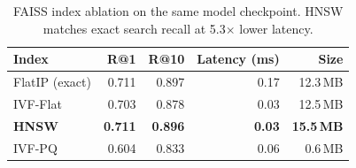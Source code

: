 \begin{table}
\caption{FAISS index ablation on the same model checkpoint. HNSW matches exact search recall at 5.3$\times$ lower latency.}
\label{tab:faiss}
\begin{tabular}{lrrrr}
\toprule
Index & R@1 & R@10 & Latency (ms) & Size \\
\midrule
FlatIP (exact) & 0.711 & 0.897 & 0.17 & 12.3\,MB \\
IVF-Flat & 0.703 & 0.878 & 0.03 & 12.5\,MB \\
\textbf{HNSW} & \textbf{0.711} & \textbf{0.896} & \textbf{0.03} & \textbf{15.5\,MB} \\
IVF-PQ & 0.604 & 0.833 & 0.06 & 0.6\,MB \\
\bottomrule
\end{tabular}
\end{table}
